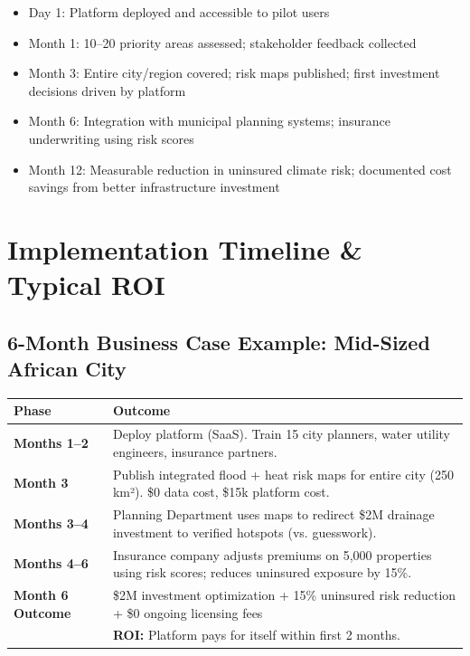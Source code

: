 \documentclass[11pt, a4paper]{article}
\begin{document}
\begin{itemize}[noitemsep, leftmargin=1.5em, font=\small]
  \item Day 1: Platform deployed and accessible to pilot users
  \item Month 1: 10–20 priority areas assessed; stakeholder feedback collected
  \item Month 3: Entire city/region covered; risk maps published; first investment decisions driven by platform
  \item Month 6: Integration with municipal planning systems; insurance underwriting using risk scores
  \item Month 12: Measurable reduction in uninsured climate risk; documented cost savings from better infrastructure investment
\end{itemize}

\section*{Implementation Timeline \& Typical ROI}

\subsection*{6-Month Business Case Example: Mid-Sized African City}

\begin{tabularx}{\linewidth}{>{\bfseries}p{4cm} X}
\toprule
\textcolor{primary}{Phase} & \textcolor{primary}{Outcome} \\
\midrule
Months 1–2       & Deploy platform (SaaS). Train 15 city planners, water utility engineers, insurance partners. \\[4pt]
Month 3          & Publish integrated flood + heat risk maps for entire city (250 km²). \$0 data cost, \$15k platform cost. \\[4pt]
Months 3–4       & Planning Department uses maps to redirect \$2M drainage investment to verified hotspots (vs. guesswork). \\[4pt]
Months 4–6       & Insurance company adjusts premiums on 5,000 properties using risk scores; reduces uninsured exposure by 15\%. \\[4pt]
Month 6 Outcome  & \$2M investment optimization + 15\% uninsured risk reduction + \$0 ongoing licensing fees \\[4pt]
& \textbf{ROI:} Platform pays for itself within first 2 months. \\
\bottomrule
\end{tabularx}
\end{document}
